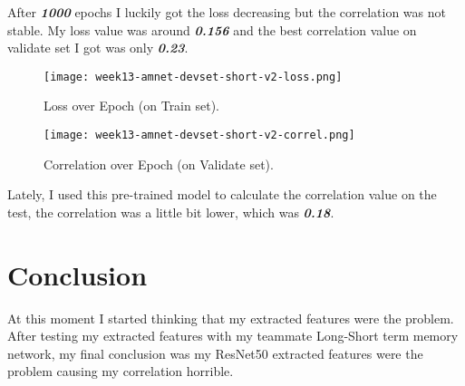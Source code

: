 After \textbf{\emph{1000}} epochs I luckily got the loss decreasing but the correlation was not stable. My loss value was around \textbf{\emph{0.156}} and the best correlation value on validate set I got was only \textbf{\emph{0.23}}.

\newpage
\begin{figure}[!ht]
\centering
\texttt{[image: week13-amnet-devset-short-v2-loss.png]}
\caption{Loss over Epoch (on Train set).}
\end{figure}

\begin{figure}[!ht]
\centering
\texttt{[image: week13-amnet-devset-short-v2-correl.png]}
\caption{Correlation over Epoch (on Validate set).}
\end{figure}

Lately, I used this pre-trained model to calculate the correlation value on the test, the correlation was a little bit lower, which was \textbf{\emph{0.18}}.

\section{Conclusion}
At this moment I started thinking that my extracted features were the problem. After testing my extracted features with my teammate Long-Short term memory network, my final conclusion was my ResNet50 extracted features were the problem causing my correlation horrible.
